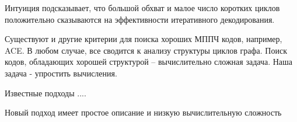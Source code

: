 \startprefacepage

Интуиция подсказывает, что большой обхват и 
малое число коротких циклов положительно сказываются на эффективности 
итеративного декодирования.

Существуют и другие критерии для поиска хороших МППЧ кодов, например, ACE. 
В любом случае, все сводится к анализу структуры циклов графа. 
Поиск кодов, обладающих хорошей  структурой -- вычислительно сложная задача.
Наша задача - упростить вычисления. 

Известные подходы ....

Новый подход имеет простое описание и низкую вычислительную сложность
